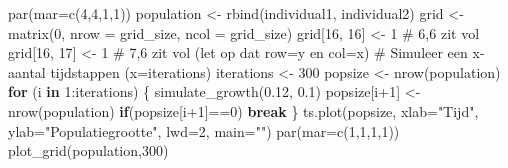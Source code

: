 \documentclass[
  a4paper,
]{scrbook}
\newenvironment{Shaded}{\begin{snugshade}}{\end{snugshade}}
\newcommand{\AttributeTok}[1]{\textcolor[rgb]{0.40,0.45,0.13}{#1}}
\newcommand{\CommentTok}[1]{\textcolor[rgb]{0.37,0.37,0.37}{#1}}
\newcommand{\ControlFlowTok}[1]{\textcolor[rgb]{0.00,0.23,0.31}{\textbf{#1}}}
\newcommand{\DecValTok}[1]{\textcolor[rgb]{0.68,0.00,0.00}{#1}}
\newcommand{\FloatTok}[1]{\textcolor[rgb]{0.68,0.00,0.00}{#1}}
\newcommand{\FunctionTok}[1]{\textcolor[rgb]{0.28,0.35,0.67}{#1}}
\newcommand{\NormalTok}[1]{\textcolor[rgb]{0.00,0.23,0.31}{#1}}
\newcommand{\OtherTok}[1]{\textcolor[rgb]{0.00,0.23,0.31}{#1}}
\newcommand{\SpecialCharTok}[1]{\textcolor[rgb]{0.37,0.37,0.37}{#1}}
\newcommand{\StringTok}[1]{\textcolor[rgb]{0.13,0.47,0.30}{#1}}
\theoremstyle{definition}
\theoremstyle{remark}
\begin{document}
\begin{Shaded}
\begin{Highlighting}[]
\FunctionTok{par}\NormalTok{(}\AttributeTok{mar=}\FunctionTok{c}\NormalTok{(}\DecValTok{4}\NormalTok{,}\DecValTok{4}\NormalTok{,}\DecValTok{1}\NormalTok{,}\DecValTok{1}\NormalTok{))}
\NormalTok{population }\OtherTok{\textless{}{-}} \FunctionTok{rbind}\NormalTok{(individual1, individual2)}
\NormalTok{grid }\OtherTok{\textless{}{-}} \FunctionTok{matrix}\NormalTok{(}\DecValTok{0}\NormalTok{, }\AttributeTok{nrow =}\NormalTok{ grid\_size, }\AttributeTok{ncol =}\NormalTok{ grid\_size)}
\NormalTok{grid[}\DecValTok{16}\NormalTok{, }\DecValTok{16}\NormalTok{] }\OtherTok{\textless{}{-}} \DecValTok{1} \CommentTok{\# 6,6 zit vol}
\NormalTok{grid[}\DecValTok{16}\NormalTok{, }\DecValTok{17}\NormalTok{] }\OtherTok{\textless{}{-}} \DecValTok{1} \CommentTok{\# 7,6 zit vol (let op dat row=y en col=x)}
\CommentTok{\# Simuleer een x{-}aantal tijdstappen (x=iterations)}
\NormalTok{iterations }\OtherTok{\textless{}{-}} \DecValTok{300}
\NormalTok{popsize }\OtherTok{\textless{}{-}} \FunctionTok{nrow}\NormalTok{(population)}
\ControlFlowTok{for}\NormalTok{ (i }\ControlFlowTok{in} \DecValTok{1}\SpecialCharTok{:}\NormalTok{iterations) \{}
  \FunctionTok{simulate\_growth}\NormalTok{(}\FloatTok{0.12}\NormalTok{, }\FloatTok{0.1}\NormalTok{)}
\NormalTok{  popsize[i}\SpecialCharTok{+}\DecValTok{1}\NormalTok{] }\OtherTok{\textless{}{-}} \FunctionTok{nrow}\NormalTok{(population)}
  \ControlFlowTok{if}\NormalTok{(popsize[i}\SpecialCharTok{+}\DecValTok{1}\NormalTok{]}\SpecialCharTok{==}\DecValTok{0}\NormalTok{) }\ControlFlowTok{break}
\NormalTok{\}}
\FunctionTok{ts.plot}\NormalTok{(popsize, }\AttributeTok{xlab=}\StringTok{"Tijd"}\NormalTok{, }\AttributeTok{ylab=}\StringTok{"Populatiegrootte"}\NormalTok{, }\AttributeTok{lwd=}\DecValTok{2}\NormalTok{, }\AttributeTok{main=}\StringTok{""}\NormalTok{)}
\FunctionTok{par}\NormalTok{(}\AttributeTok{mar=}\FunctionTok{c}\NormalTok{(}\DecValTok{1}\NormalTok{,}\DecValTok{1}\NormalTok{,}\DecValTok{1}\NormalTok{,}\DecValTok{1}\NormalTok{))}
\FunctionTok{plot\_grid}\NormalTok{(population,}\DecValTok{300}\NormalTok{)}
\end{Highlighting}
\end{Shaded}
\end{document}

